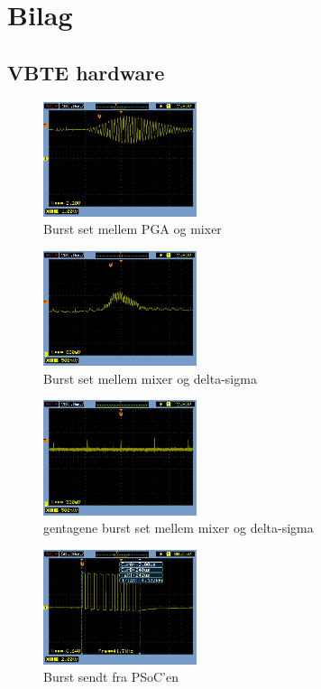 \chapter{Bilag}

\section{VBTE hardware}
\begin{figure}[hbpt]
\centering
\includegraphics[width = 0.4\textwidth]{billeder/PGA}
\caption{Burst set mellem PGA og mixer}
\label{fig:PGA}
\end{figure}
\begin{figure}[hbpt]
\centering
\includegraphics[width = 0.4\textwidth]{billeder/mixer}
\caption{Burst set mellem mixer og delta-sigma}
\label{fig:mixer}
\end{figure}
\begin{figure}[hbpt]
\centering
\includegraphics[width = 0.4\textwidth]{billeder/mixer2}
\caption{gentagene burst set mellem mixer og delta-sigma}
\label{fig:mixer2}
\end{figure}
\begin{figure}[hbpt]
\centering
\includegraphics[width = 0.4\textwidth]{billeder/burst}
\caption{Burst sendt fra PSoC'en}
\label{fig:flereburstpsoc}
\end{figure}
